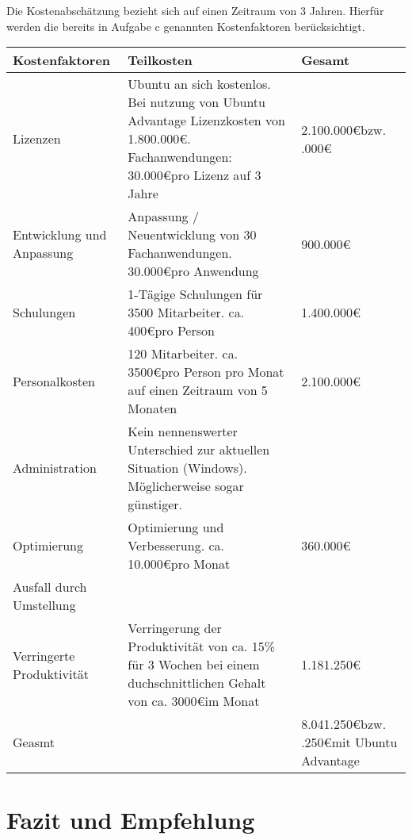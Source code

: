 \documentclass[12pt,utf8]{scrartcl}
\begin{document}
Die Kostenabschätzung bezieht sich auf einen Zeitraum von 3 Jahren. Hierfür werden die bereits in Aufgabe c genannten Kostenfaktoren berücksichtigt.

\begin{table}[h]
\begin{tabular}{|p{5cm}|p{8cm}|p{2cm}|}
\hline
Kostenfaktoren & Teilkosten & Gesamt \\
\hline
Lizenzen & Ubuntu an sich kostenlos. Bei nutzung von Ubuntu Advantage Lizenzkosten von 1.800.000\euro . \newline 70 Fachanwendungen: 30.000\euro \space pro Lizenz auf 3 Jahre & 2.100.000\euro \newline bzw. \newline 3.900.000\euro \\
\hline
Entwicklung und Anpassung & Anpassung / Neuentwicklung von 30 Fachanwendungen. 30.000\euro \space pro Anwendung & 900.000\euro \\
\hline
Schulungen & 1-Tägige Schulungen für 3500 Mitarbeiter. ca. 400\euro \space pro Person & 1.400.000\euro \\
\hline
Personalkosten & 120 Mitarbeiter. ca. 3500\euro \space pro Person pro Monat auf einen Zeitraum von 5 Monaten & 2.100.000\euro \\
\hline
Administration & Kein nennenswerter Unterschied zur aktuellen Situation (Windows). Möglicherweise sogar günstiger. & \\
\hline
Optimierung & Optimierung und Verbesserung. ca. 10.000\euro pro Monat & 360.000\euro \\
\hline
Ausfall durch Umstellung & & \\
\hline
Verringerte Produktivität & Verringerung der Produktivität von ca. 15\% für 3 Wochen bei einem duchschnittlichen Gehalt von ca. 3000\euro \space im Monat & 1.181.250\euro \\
\hline
Geasmt & & 8.041.250\euro \newline bzw. \newline 9.841.250\euro \space mit Ubuntu Advantage \\
\hline
\end{tabular}
\end{table}

\section*{Fazit und Empfehlung}

\newpage
{}

\end{document}
